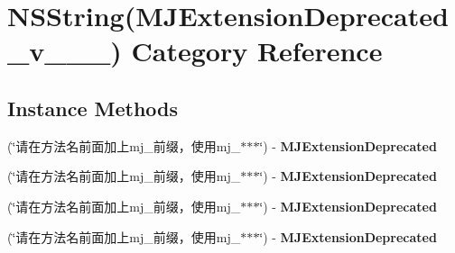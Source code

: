 \hypertarget{category_n_s_string_07_m_j_extension_deprecated__v__2__5__16_08}{}\section{N\+S\+String(M\+J\+Extension\+Deprecated\+\_\+v\+\_\+\_\+\_) Category Reference}
\label{category_n_s_string_07_m_j_extension_deprecated__v__2__5__16_08}
\subsection*{Instance Methods}
\begin{DoxyCompactItemize}
\item 
\mbox{\label{category_n_s_string_07_m_j_extension_deprecated__v__2__5__16_08_ab08e53dd4b8481f26934085e7ff40d45}} 
(\char`\"{}请在方法名前面加上mj\+\_\+前缀，使用mj\+\_\+$\ast$$\ast$$\ast$\char`\"{}) -\/ {\bfseries M\+J\+Extension\+Deprecated}
\item 
\mbox{\label{category_n_s_string_07_m_j_extension_deprecated__v__2__5__16_08_ab08e53dd4b8481f26934085e7ff40d45}} 
(\char`\"{}请在方法名前面加上mj\+\_\+前缀，使用mj\+\_\+$\ast$$\ast$$\ast$\char`\"{}) -\/ {\bfseries M\+J\+Extension\+Deprecated}
\item 
\mbox{\label{category_n_s_string_07_m_j_extension_deprecated__v__2__5__16_08_ab08e53dd4b8481f26934085e7ff40d45}} 
(\char`\"{}请在方法名前面加上mj\+\_\+前缀，使用mj\+\_\+$\ast$$\ast$$\ast$\char`\"{}) -\/ {\bfseries M\+J\+Extension\+Deprecated}
\item 
\mbox{\label{category_n_s_string_07_m_j_extension_deprecated__v__2__5__16_08_ab08e53dd4b8481f26934085e7ff40d45}} 
(\char`\"{}请在方法名前面加上mj\+\_\+前缀，使用mj\+\_\+$\ast$$\ast$$\ast$\char`\"{}) -\/ {\bfseries M\+J\+Extension\+Deprecated}
\item 
\mbox{\label{category_n_s_string_07_m_j_extension_deprecated__v__2__5__16_08_ab08e53dd4b8481f26934085e7ff40d45}} 

\end{DoxyCompactItemize}
